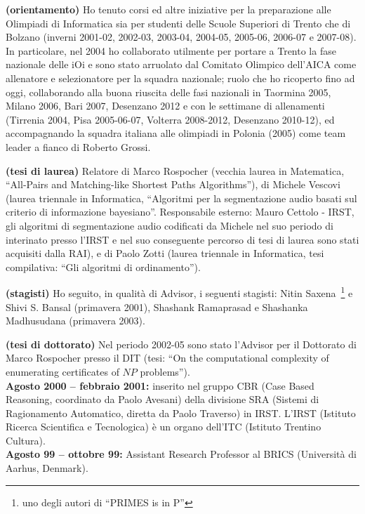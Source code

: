 {\bf (orientamento)} Ho tenuto corsi ed altre iniziative
per la preparazione alle Olimpiadi di Informatica
sia per studenti delle Scuole Superiori di Trento
che di Bolzano
(inverni 2001-02, 2002-03, 2003-04, 2004-05, 2005-06, 2006-07 e 2007-08).
In particolare, nel 2004 ho collaborato utilmente
per portare a Trento la fase nazionale delle iOi
e sono stato arruolato dal
Comitato Olimpico dell'AICA come allenatore e selezionatore
per la squadra nazionale;
ruolo che ho ricoperto fino ad oggi,
collaborando alla buona riuscita delle fasi nazionali
in Taormina 2005, Milano 2006, Bari 2007, Desenzano 2012
e con le settimane di allenamenti (Tirrenia 2004,
Pisa 2005-06-07, Volterra 2008-2012, Desenzano 2010-12),
ed accompagnando la squadra italiana alle olimpiadi
in Polonia (2005) come team leader a fianco di Roberto Grossi.

{\bf (tesi di laurea)} Relatore di Marco Rospocher
(vecchia laurea in Matematica,%
 ``All-Pairs and Matching-like Shortest Paths Algorithms''),
di Michele Vescovi
(laurea triennale in Informatica,%
 ``Algoritmi per la segmentazione audio basati
   sul criterio di informazione bayesiano''.
 Responsabile esterno: Mauro Cettolo - IRST,
gli algoritmi di segmentazione audio codificati da Michele
nel suo periodo di interinato presso l'IRST
e nel suo conseguente percorso di tesi di laurea sono stati
acquisiti dalla RAI),
e di Paolo Zotti
(laurea triennale in Informatica,
 tesi compilativa: ``Gli algoritmi di ordinamento'').

{\bf (stagisti)} Ho seguito, in qualit\`a di Advisor,
i seguenti stagisti: Nitin Saxena~\footnote{uno degli autori di ``PRIMES is in P''} e Shivi S. Bansal (primavera 2001),
Shashank Ramaprasad e Shashanka Madhusudana (primavera 2003).

{\bf (tesi di dottorato)} Nel periodo 2002-05 sono stato l'Advisor per il Dottorato di Marco
Rospocher presso il DIT (tesi: ``On the computational complexity
of enumerating certificates of $NP$ problems'').\\


{\bf Agosto 2000 -- febbraio 2001:}
inserito nel gruppo CBR (Case Based Reasoning, coordinato da Paolo Avesani)
della divisione SRA
(Sistemi di Ragionamento Automatico, diretta da Paolo Traverso) in IRST.
L'IRST (Istituto Ricerca Scientifica e Tecnologica)
\`e un organo dell'ITC (Istituto Trentino Cultura).\\

{\bf Agosto 99 -- ottobre 99:}
     Assistant Research Professor
     al  BRICS (Universit\`a di Aarhus, Denmark). 

